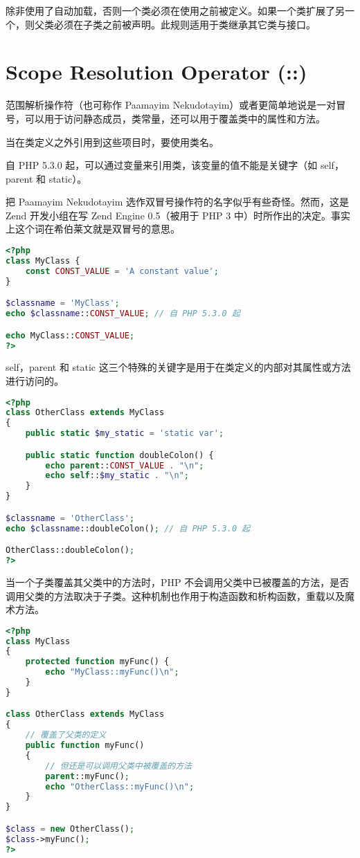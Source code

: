 除非使用了自动加载，否则一个类必须在使用之前被定义。如果一个类扩展了另一个，则父类必须在子类之前被声明。此规则适用于类继承其它类与接口。


\chapter{Scope Resolution Operator (::)}

范围解析操作符（也可称作 Paamayim Nekudotayim）或者更简单地说是一对冒号，可以用于访问静态成员，类常量，还可以用于覆盖类中的属性和方法。

当在类定义之外引用到这些项目时，要使用类名。

自 PHP 5.3.0 起，可以通过变量来引用类，该变量的值不能是关键字（如 self，parent 和 static）。

把 Paamayim Nekudotayim 选作双冒号操作符的名字似乎有些奇怪。然而，这是 Zend 开发小组在写 Zend Engine 0.5（被用于 PHP 3 中）时所作出的决定。事实上这个词在希伯莱文就是双冒号的意思。

\begin{lstlisting}[language=PHP]
<?php
class MyClass {
    const CONST_VALUE = 'A constant value';
}

$classname = 'MyClass';
echo $classname::CONST_VALUE; // 自 PHP 5.3.0 起

echo MyClass::CONST_VALUE;
?>
\end{lstlisting}

self，parent 和 static 这三个特殊的关键字是用于在类定义的内部对其属性或方法进行访问的。


\begin{lstlisting}[language=PHP]
<?php
class OtherClass extends MyClass
{
    public static $my_static = 'static var';

    public static function doubleColon() {
        echo parent::CONST_VALUE . "\n";
        echo self::$my_static . "\n";
    }
}

$classname = 'OtherClass';
echo $classname::doubleColon(); // 自 PHP 5.3.0 起

OtherClass::doubleColon();
?>
\end{lstlisting}


当一个子类覆盖其父类中的方法时，PHP 不会调用父类中已被覆盖的方法，是否调用父类的方法取决于子类。这种机制也作用于构造函数和析构函数，重载以及魔术方法。

\begin{lstlisting}[language=PHP]
<?php
class MyClass
{
    protected function myFunc() {
        echo "MyClass::myFunc()\n";
    }
}

class OtherClass extends MyClass
{
    // 覆盖了父类的定义
    public function myFunc()
    {
        // 但还是可以调用父类中被覆盖的方法
        parent::myFunc();
        echo "OtherClass::myFunc()\n";
    }
}

$class = new OtherClass();
$class->myFunc();
?>
\end{lstlisting}


